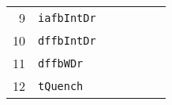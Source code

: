 \begin{table*}[!ht]
\begin{tabular*}{\textwidth}{@{}rlrrrrr@{}}
\footnotesize{9}   & \footnotesize{\texttt{iafbIntDr}}  &                        &                                 &&                         &    \\
\footnotesize{10}  & \footnotesize{\texttt{dffbIntDr}}  &                        &                                 &&                         &    \\
\footnotesize{11}  & \footnotesize{\texttt{dffbWDr}}    &                        &                                 &&                         &    \\
\footnotesize{12}  & \footnotesize{\texttt{tQuench}}    &                        &                                 &&                         &    \\
\bottomrule
\end{tabular*}
\end{table*}

